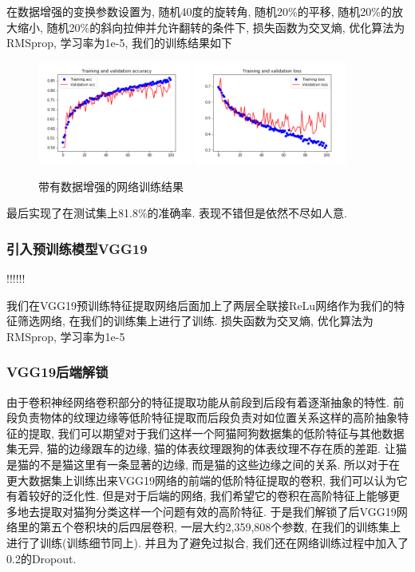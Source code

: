 \documentclass[lang=cn,11pt]{elegantpaper}
\begin{document}
在数据增强的变换参数设置为, 随机40度的旋转角, 随机20\%的平移, 随机20\%的放大缩小, 随机20\%的斜向拉伸并允许翻转的条件下, 损失函数为交叉熵, 优化算法为RMSprop, 学习率为1e-5, 我们的训练结果如下

\begin{figure}[hbt]
\centering
  \includegraphics[width=0.45\textwidth]{small_aug_1.png}
  \includegraphics[width=0.45\textwidth]{small_aug_2.png}
  \caption{带有数据增强的网络训练结果}
\end{figure}

最后实现了在测试集上81.8\%的准确率. 表现不错但是依然不尽如人意.


\subsubsection{引入预训练模型VGG19}


!!!!!!

%
%



我们在VGG19预训练特征提取网络后面加上了两层全联接ReLu网络作为我们的特征筛选网络, 在我们的训练集上进行了训练. 损失函数为交叉熵, 优化算法为RMSprop, 学习率为1e-5

\subsubsection{VGG19后端解锁}

由于卷积神经网络卷积部分的特征提取功能从前段到后段有着逐渐抽象的特性. 前段负责物体的纹理边缘等低阶特征提取而后段负责对如位置关系这样的高阶抽象特征的提取, 我们可以期望对于我们这样一个阿猫阿狗数据集的低阶特征与其他数据集无异, 猫的边缘跟车的边缘, 猫的体表纹理跟狗的体表纹理不存在质的差距. 让猫是猫的不是猫这里有一条显著的边缘, 而是猫的这些边缘之间的关系. 所以对于在更大数据集上训练出来VGG19网络的前端的低阶特征提取的卷积, 我们可以认为它有着较好的泛化性. 但是对于后端的网络, 我们希望它的卷积在高阶特征上能够更多地去提取对猫狗分类这样一个问题有效的高阶特征. 于是我们解锁了后VGG19网络里的第五个卷积块的后四层卷积, 一层大约2,359,808个参数, 在我们的训练集上进行了训练(训练细节同上). 并且为了避免过拟合, 我们还在网络训练过程中加入了0.2的Dropout.
\end{document}
